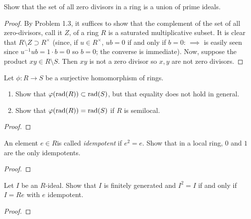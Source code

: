 \newpage
\begin{problem}
Show that the set of all zero divisors in a ring is a union of
prime ideals.
\end{problem}
\begin{proof}
By Problem 1.3, it suffices to show that the complement of the
set of all zero-divisors, call it $Z$, of a ring $R$ is a
saturated multiplicative subset. It is clear that $R\setminus
Z\supset R^\times$ (since, if $u\in R^\times$, $ub=0$ if and only
if $b=0$: $\implies$ is easily seen since $u^{-1}ub=1\cdot b=0$
so $b=0$; the converse is immediate). Now, suppose the product
$xy\in R\setminus S$. Then $xy$ is not a zero divisor so $x,y$
are not zero divisors.
\end{proof}
\newpage
\begin{problem}
Let $\phi\colon R\to S$ be a surjective homomorphism of
rings.
\begin{enumerate}[noitemsep,label=(\alph*)]
\item Show that $\varphi(\mathrm{rad}(R))\subset\mathrm{rad}(S)$, but that
  equality does not hold in general.
\item Show that $\varphi(\mathrm{rad}(R))=\mathrm{rad}(S)$ if $R$ is semilocal.
\end{enumerate}
\end{problem}
\begin{proof}
\end{proof}
\newpage
\begin{problem}
An element $e\in R$is called \emph{idempotent} if $e^2=e$. Show
that in a local ring, $0$ and $1$ are the only idempotents.
\end{problem}
\begin{proof}
\end{proof}
\newpage
\begin{problem}
Let $I$ be an $R$-ideal. Show that $I$ is finitely generated and
$I^2=I$ if and only if $I=Re$ with $e$ idempotent.
\end{problem}
\begin{proof}
\end{proof}


